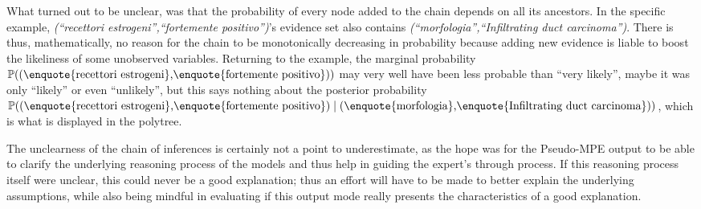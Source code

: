 What turned out to be unclear, was that the probability of every node added to the chain depends on all its ancestors.
In the specific example, \textit{(\enquote{recettori estrogeni},\enquote{fortemente positivo})}'s evidence set also contains \textit{(\enquote{morfologia},\enquote{Infiltrating duct carcinoma})}.
There is thus, mathematically, no reason for the chain to be monotonically decreasing in probability because adding new evidence is liable to boost the likeliness of some unobserved variables.
Returning to the example, the marginal probability $\mathbb{P}((\text{\enquote{recettori estrogeni},\enquote{fortemente positivo}}))$ may very well have been less probable than \enquote{very likely}, maybe it was only \enquote{likely} or even \enquote{unlikely}, but this says nothing about the posterior probability $\mathbb{P}((\text{\enquote{recettori estrogeni},\enquote{fortemente positivo}}) \mid (\text{\enquote{morfologia},\enquote{Infiltrating duct carcinoma}}) )$, which is what is displayed in the polytree.

The unclearness of the chain of inferences is certainly not a point to underestimate, as the hope was for the Pseudo-MPE output to be able to clarify the underlying reasoning process of the models and thus help in guiding the expert's through process.
If this reasoning process itself were unclear, this could never be a good explanation; thus an effort will have to be made to better explain the underlying assumptions, while also being mindful in evaluating if this output mode really presents the characteristics of a good explanation.

